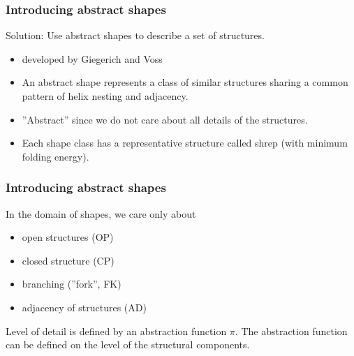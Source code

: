 \documentclass[ignorenonframetext,10pt]{beamer}
\begin{document}
\begin{frame}
\frametitle{Introducing abstract shapes}
    Solution: Use abstract shapes to describe a set of structures.
    \begin{itemize} 
    \item developed by Giegerich and Voss
    \item An abstract shape represents a class of similar structures sharing a
    common pattern of helix nesting and adjacency.
    \item ''Abstract'' since we do not care about all details of the structures.
    \item Each shape class has a representative structure called shrep (with minimum folding energy).
    \end{itemize}
\end{frame}

\begin{frame}
\frametitle{Introducing abstract shapes}
    In the domain of shapes, we care only about
    \begin{itemize} 
    \item open structures (OP)
    \item closed structure (CP)
    \item branching (''fork'', FK)
    \item adjacency of structures (AD)
    \end{itemize}
    Level of detail is defined by an abstraction function $\pi$.
    The abstraction function can be defined on the level of the structural components.
\end{frame}

\end{document}
